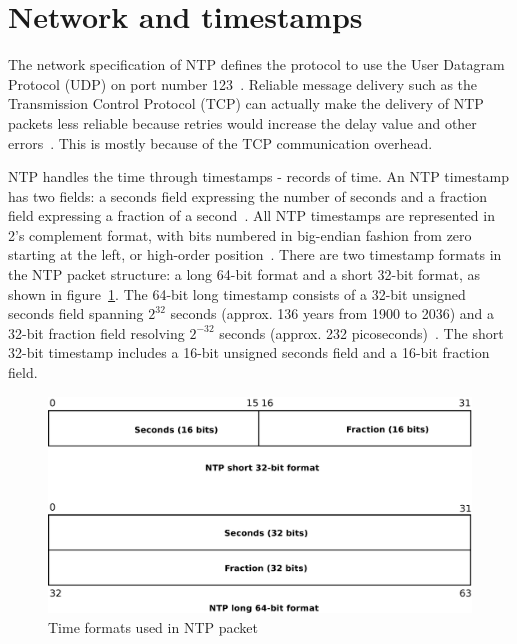 
\section{Network and timestamps}\label{sec:ntp-network}
The network specification of NTP defines
the protocol to use the User Datagram Protocol (UDP) on port number 123~\cite{ianna-ports,rfc5905}.
Reliable message delivery such as the Transmission Control Protocol (TCP)
can actually make the delivery of
NTP packets less reliable because retries
would increase the delay value and other errors~\cite{rfc5905}.
This is mostly because of the TCP communication overhead.

NTP handles the time through timestamps - records of time.
An NTP timestamp has two fields: a seconds field expressing the number of seconds
and a fraction field expressing a fraction of a second~\cite{rfc5905}.
All NTP timestamps are represented in 2's complement format, with
bits numbered in big-endian fashion from zero starting at the left, or high-order position~\cite{rfc5905}.
There are two timestamp formats in the NTP packet structure:
a long 64-bit format and a short 32-bit format, as shown in figure~\ref{fig:ntp-timestamps}.
The 64-bit long timestamp consists of a 32-bit unsigned seconds
field spanning $2^{32}$ seconds (approx. 136 years from 1900 to 2036) and a 32-bit fraction field resolving
$2^{-32}$ seconds (approx. 232 picoseconds)~\cite{rfc5905}.
The short 32-bit timestamp includes a 16-bit unsigned seconds field
and a 16-bit fraction field.

\begin{figure}
	\centering
	\includegraphics[width=13cm,keepaspectratio]{fig/ntp-timestamps.pdf}
	\caption{Time formats used in NTP packet}
	\label{fig:ntp-timestamps}
	\bigskip
\end{figure}

